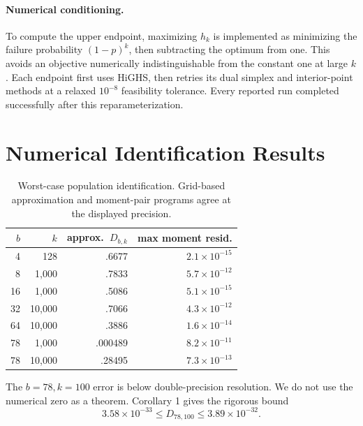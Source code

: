 \documentclass[twoside]{article}
\begin{document}
\paragraph{Numerical conditioning.}
To compute the upper endpoint, maximizing \(h_k\) is implemented as minimizing
the failure probability \((1-p)^k\), then subtracting the optimum from one.
This avoids an objective numerically indistinguishable from the constant
one at large \(k\). Each endpoint first uses HiGHS, then retries its dual
simplex and interior-point methods at a relaxed \(10^{-8}\) feasibility
tolerance. Every reported run completed successfully after this
reparameterization.

\section{Numerical Identification Results}

\begin{table}[t]
\caption{Worst-case population identification. Grid-based approximation and
moment-pair programs agree at the displayed precision.}
\label{tab:diameters}
\centering
\small
\begin{tabular}{rrrr}
\toprule
\(b\) & \(k\) & approx.\ \(D_{b,k}\) & max moment resid.\\
\midrule
4  & 128    & .6677 & \(2.1\times10^{-15}\)\\
8  & 1,000  & .7833 & \(5.7\times10^{-12}\)\\
16 & 1,000  & .5086 & \(5.1\times10^{-15}\)\\
32 & 10,000 & .7066 & \(4.3\times10^{-12}\)\\
64 & 10,000 & .3886 & \(1.6\times10^{-14}\)\\
78 & 1,000  & .000489 & \(8.2\times10^{-11}\)\\
78 & 10,000 & .28495 & \(7.3\times10^{-13}\)\\
\bottomrule
\end{tabular}
\end{table}

The \(b=78,k=100\) error is below double-precision resolution. We do not use
the numerical zero as a theorem. Corollary 1 gives the rigorous bound
\[
 3.58\times10^{-33}\leq D_{78,100}
 \leq3.89\times10^{-32}.
\]
\end{document}
